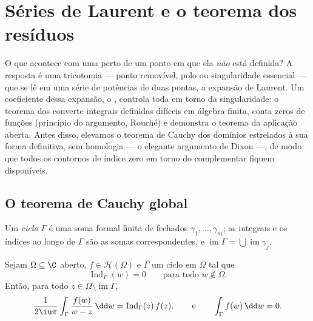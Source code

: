 \chapter{Séries de Laurent e o teorema dos resíduos}
\label{ch:b3:residues}

O que acontece com uma  perto de um ponto em que ela
\emph{não} está definida? A resposta é uma tricotomia  ---
ponto removível, polo ou singularidade essencial --- que se lê em uma
série de potências de duas pontas, a expansão de Laurent. Um
coeficiente dessa expansão, o \emph{}, controla toda  em torno da singularidade: o teorema dos  converte
integrais definidas difíceis em álgebra finita, conta zeros de funções
(princípio do argumento, Rouché) e demonstra o teorema da aplicação
aberta. Antes disso, elevamos o teorema de Cauchy dos domínios
estrelados à sua forma definitiva, sem homologia --- o elegante
argumento de Dixon ---, de modo que todos os contornos de índice zero em
torno do complementar fiquem disponíveis.

\section{O teorema de Cauchy global}

Um \emph{ciclo} $\Gamma$ é uma soma formal finita de
 fechados $\gamma_1, \dots, \gamma_m$; as integrais e os índices ao longo de
$\Gamma$ são as somas correspondentes, e $\operatorname{im}\Gamma = \bigcup\operatorname{im}\gamma_j$.

\begin{theorem}
\label{thm:b3:residues:globalcauchy}
Sejam $\Omega \subseteq \C$ aberto, $f \in \mathcal H(\Omega)$ e $\Gamma$ um ciclo em $\Omega$ tal que
\[
\operatorname{Ind}_\Gamma(w) = 0
\qquad\text{para todo } w \notin \Omega .
\]
Então, para todo $z \in \Omega\setminus\operatorname{im}\Gamma$,
\[
\frac1{2\iu\pi}\int_\Gamma\frac{f(w)}{w - z}\,\dd w =
\operatorname{Ind}_\Gamma(z)\,f(z),
\qquad\text{e}\qquad
\int_\Gamma f(w)\,\dd w = 0 .
\]
\end{theorem}

